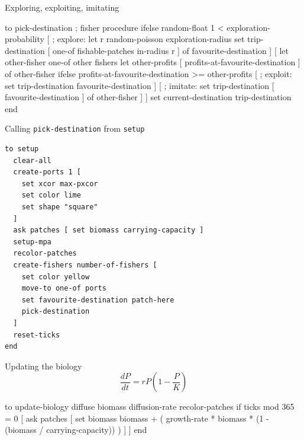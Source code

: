 \documentclass[table, 14pt, aspectratio=169]{beamer}
\begin{document}
\begin{frame}[fragile=singleslide]{Exploring, exploiting, imitating}
  \begin{adjustbox}{max width=\linewidth}
    \begin{nlogo}
to pick-destination ; fisher procedure
  ifelse random-float 1 < exploration-probability [
    ; explore:
    let r random-poisson exploration-radius
    set trip-destination [ one-of fishable-patches in-radius r ] of favourite-destination
  ] [
    let other-fisher one-of other fishers
    let other-profits [ profits-at-favourite-destination ] of other-fisher
    ifelse profits-at-favourite-destination >= other-profits [
      ; exploit:
      set trip-destination favourite-destination
    ] [
      ; imitate:
      set trip-destination [ favourite-destination ] of other-fisher
    ]
  ]
  set current-destination trip-destination
end
    \end{nlogo}
  \end{adjustbox}
\end{frame}

\begin{frame}[fragile=singleslide]{Calling \texttt{pick-destination} from \texttt{setup}}
  \begin{adjustbox}{max height=0.75\textheight}
  \begin{verbatim}
to setup
  clear-all
  create-ports 1 [
    set xcor max-pxcor
    set color lime
    set shape "square"
  ]
  ask patches [ set biomass carrying-capacity ]
  setup-mpa
  recolor-patches
  create-fishers number-of-fishers [
    set color yellow
    move-to one-of ports
    set favourite-destination patch-here
    pick-destination
  ]
  reset-ticks
end
    \end{verbatim}
  \end{adjustbox}
\end{frame}


\begin{frame}[fragile=singleslide]{Updating the biology}
  \vfill
  $$\frac{dP}{dt}=r P \left(1 - \frac{P}{K}\right)$$
  \vfill
  \begin{adjustbox}{max width=\linewidth}
    \begin{nlogo}
to update-biology
  diffuse biomass diffusion-rate
  recolor-patches
  if ticks mod 365 = 0 [
    ask patches [
      set biomass biomass + (
        growth-rate * biomass * (1 - (biomass / carrying-capacity))
      )
    ]
  ]
end
    \end{nlogo}
  \end{adjustbox}
\end{frame}
\end{document}
